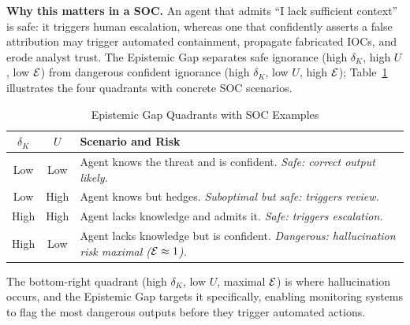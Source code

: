 \textbf{Why this matters in a SOC.}
An agent that admits ``I lack sufficient context'' is safe: it triggers
human escalation, whereas one that confidently asserts a false attribution
may trigger automated containment, propagate fabricated IOCs, and erode
analyst trust. The Epistemic Gap separates safe ignorance (high $\delta_K$,
high $U$, low $\mathcal{E}$) from dangerous confident ignorance (high $\delta_K$,
low $U$, high $\mathcal{E}$); Table~\ref{tab:eg_examples} illustrates the four
quadrants with concrete SOC scenarios.

\begin{table}[t]
\caption{Epistemic Gap Quadrants with SOC Examples}
\label{tab:eg_examples}
\centering
\footnotesize
\setlength{\tabcolsep}{2.5pt}
\begin{tabular}{ccp{3.8cm}}
\toprule
$\delta_K$ & $U$ & \textbf{Scenario and Risk} \\
\midrule
Low  & Low  & Agent knows the threat and is confident. \textit{Safe: correct output likely.} \\
Low  & High & Agent knows but hedges. \textit{Suboptimal but safe: triggers review.} \\
High & High & Agent lacks knowledge and admits it. \textit{Safe: triggers escalation.} \\
High & Low  & Agent lacks knowledge but is confident. \textit{Dangerous: hallucination risk maximal ($\mathcal{E} \approx 1$).} \\
\bottomrule
\end{tabular}
\end{table}

The bottom-right quadrant (high $\delta_K$, low $U$, maximal $\mathcal{E}$) is where
hallucination occurs, and the Epistemic Gap targets it specifically,
enabling monitoring systems to flag the most dangerous outputs before they
trigger automated actions.
